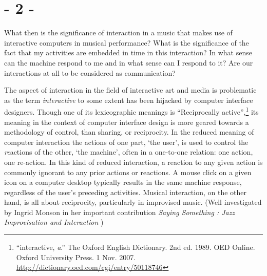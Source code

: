 \documentclass{article}
\begin{document}



\section*{- 2 -}
\label{sec:-2-}


What then is the significance of interaction in a music that makes use of interactive computers in musical performance? What is the significance of the fact that my activities are embedded in time in this interaction?
In what sense can the machine respond to me and in what sense can I respond to it? Are our interactions at all to be considered as communication?

The aspect of interaction in the field of interactive art and media is problematic as the term \emph{interactive} to some extent has been hijacked by computer interface designers. Though one of its lexicographic meanings is ``Reciprocally active'',\footnote{``interactive, \textit{a}.'' The Oxford English Dictionary. 2nd ed. 1989. OED Online. Oxford University Press. 1 Nov. 2007. \url{http://dictionary.oed.com/cgi/entry/50118746}} its meaning in the context of computer interface design is more geared towards a methodology of control, than sharing, or reciprocity. In the reduced meaning of computer interaction the actions of one part, `the user', is used to control the \emph{re}actions of the other, `the machine', often in a one-to-one relation: one action, one re-action. In this kind of reduced interaction, a reaction to any given action is commonly ignorant to any prior actions or reactions. A mouse click on a given icon on a computer desktop typically results in the same machine response, regardless of the user's preceding activities. Musical interaction, on the other hand, is all about reciprocity, particularly in improvised music. (Well investigated by Ingrid Monson in her important contribution \emph{Saying Something : Jazz Improvisation and Interaction} \citep[][]{monson96} )
\end{document}
